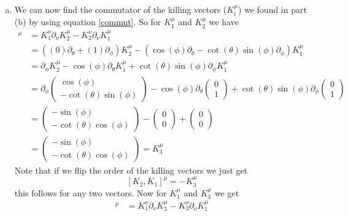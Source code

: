 \documentclass[11pt]{article}
\numberwithin{equation}{section}
\begin{document}
\begin{enumerate}[(a)]
\item
We can now find the commutator of the killing vectors ($K^{\mu}_{i}$) we found in part (b) by using equation \ref{commut}. So for $K^{\mu}_1$ and $K^{\mu}_2$ we have 
\begin{align*}
[K_1,K_2]^{\mu} &= K^{\nu}_1\partial_{\nu}K^{\mu}_{2} -K^{\nu}_2\partial_{\nu}K^{\mu}_{1}\\
&= \left((0)\partial_{\theta}+(1)\partial_{\phi}\right)K^{\mu}_{2} - \left(\cos(\phi)\partial_{\theta} -\cot(\theta)\sin(\phi)\partial_{\phi}\right)K^{\mu}_{1}\\
&= \partial_{\phi}K^{\mu}_{2} - \cos(\phi)\partial_{\theta}K^{\mu}_{1} + \cot(\theta)\sin(\phi)\partial_{\phi}K^{\mu}_{1}\\
&= \partial_{\phi}\left(\begin{array}{c}
			\cos(\phi)\\	-\cot(\theta)\sin(\phi)
		\end{array}\right)
 - \cos(\phi)\partial_{\theta}\left(\begin{array}{c}
			0\\	1
		\end{array}\right)
+ \cot(\theta)\sin(\phi)\partial_{\phi}\left(\begin{array}{c}
			0\\	1
		\end{array}\right)\\
&= \left(\begin{array}{c}
			-\sin(\phi)\\	-\cot(\theta)\cos(\phi)
		\end{array}\right)
 - \left(\begin{array}{c}
			0\\	0
		\end{array}\right)
+ \left(\begin{array}{c}
			0\\	0
		\end{array}\right)\\
&= \left(\begin{array}{c}
			-\sin(\phi)\\	-\cot(\theta)\cos(\phi)
		\end{array}\right) = K^{\mu}_3
\end{align*}
Note that if we flip the order of the killing vectors we just get
$$[K_2,K_1]^{\mu} = -K^{\mu}_3$$
this follows for any two vectors. Now for $K^{\mu}_1$ and $K^{\mu}_3$ we get
\begin{align*}
[K_1,K_3]^{\mu} &= K^{\nu}_1\partial_{\nu}K^{\mu}_{3} -K^{\nu}_3\partial_{\nu}K^{\mu}_{1}\\

\end{align*}
\end{enumerate}
\end{document}
